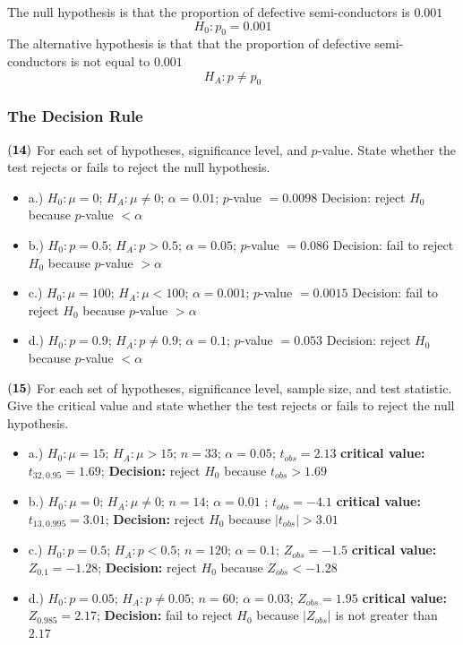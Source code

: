 \documentclass[
]{article}
\begin{document}
{ The null hypothesis is that the proportion of defective
semi-conductors is \(0.001\) \[ H_0: p_0 = 0.001\] The alternative
hypothesis is that that the proportion of defective semi-conductors is
not equal to \(0.001\) \[ H_A: p \neq p_0 \] }

\subsubsection{The Decision Rule}\label{the-decision-rule}

\(\bf (14)\) For each set of hypotheses, significance level, and
\(p\)-value. State whether the test rejects or fails to reject the null
hypothesis.

\begin{itemize}
\item
  a.) \(H_0: \mu = 0\); \(H_A: \mu \neq 0\); \(\alpha = 0.01\);
  \(p\)-value \(= 0.0098\) {Decision: reject \(H_0\) because \(p\)-value
  \(<\alpha\) }
\item
  b.) \(H_0: p = 0.5\); \(H_A: p > 0.5\); \(\alpha = 0.05\); \(p\)-value
  \(= 0.086\) {Decision: fail to reject \(H_0\) because \(p\)-value
  \(>\alpha\) }
\item
  c.) \(H_0: \mu = 100\); \(H_A: \mu < 100\); \(\alpha = 0.001\);
  \(p\)-value \(= 0.0015\) {Decision: fail to reject \(H_0\) because
  \(p\)-value \(>\alpha\) }
\item
  d.) \(H_0: p = 0.9\); \(H_A: p \neq 0.9\); \(\alpha = 0.1\);
  \(p\)-value \(= 0.053\) {Decision: reject \(H_0\) because \(p\)-value
  \(<\alpha\) }
\end{itemize}

\(\bf (15)\) For each set of hypotheses, significance level, sample
size, and test statistic. Give the critical value and state whether the
test rejects or fails to reject the null hypothesis.

\begin{itemize}
\item
  a.) \(H_0: \mu = 15\); \(H_A: \mu > 15\); \(n = 33\);
  \(\alpha = 0.05\); \(t_{obs} = 2.13\) { \textbf{critical value:}
  \(t_{32, 0.95 } = 1.69\); \textbf{Decision:} reject \(H_0\) because
  \(t_{obs}>1.69\) }
\item
  b.) \(H_0: \mu = 0\); \(H_A: \mu \neq 0\); \(n = 14\);
  \(\alpha = 0.01\) ; \(t_{obs} = -4.1\) { \textbf{critical value:}
  \(t_{13, 0.995} = 3.01\); \textbf{Decision:} reject \(H_0\) because
  \(| t_{obs}| > 3.01\)}
\item
  c.) \(H_0: p = 0.5\); \(H_A: p < 0.5\); \(n = 120\); \(\alpha = 0.1\);
  \(Z_{obs} = -1.5\) { \textbf{critical value:} \(Z_{0.1} = -1.28\);
  \textbf{Decision:} reject \(H_0\) because \(Z_{obs} < -1.28\)}
\item
  d.) \(H_0: p = 0.05\); \(H_A: p \neq 0.05\); \(n = 60\);
  \(\alpha = 0.03\); \(Z_{obs} = 1.95\) { \textbf{critical value:}
  \(Z_{0.985}= 2.17\); \textbf{Decision:} fail to reject \(H_0\) because
  \(|Z_{obs}|\) is not greater than \(2.17\)}
\end{itemize}
\end{document}
